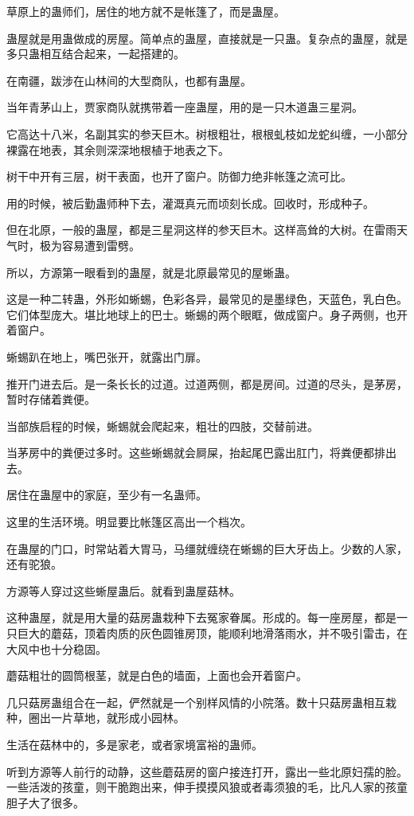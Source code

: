 \begin{this_body}
草原上的蛊师们，居住的地方就不是帐篷了，而是蛊屋。

蛊屋就是用蛊做成的房屋。简单点的蛊屋，直接就是一只蛊。复杂点的蛊屋，就是多只蛊相互结合起来，一起搭建的。

在南疆，跋涉在山林间的大型商队，也都有蛊屋。

当年青茅山上，贾家商队就携带着一座蛊屋，用的是一只木道蛊三星洞。

它高达十八米，名副其实的参天巨木。树根粗壮，根根虬枝如龙蛇纠缠，一小部分裸露在地表，其余则深深地根植于地表之下。

树干中开有三层，树干表面，也开了窗户。防御力绝非帐篷之流可比。

用的时候，被后勤蛊师种下去，灌溉真元而顷刻长成。回收时，形成种子。

但在北原，一般的蛊屋，都是三星洞这样的参天巨木。这样高耸的大树。在雷雨天气时，极为容易遭到雷劈。

所以，方源第一眼看到的蛊屋，就是北原最常见的屋蜥蛊。

这是一种二转蛊，外形如蜥蜴，色彩各异，最常见的是墨绿色，天蓝色，乳白色。它们体型庞大。堪比地球上的巴士。蜥蜴的两个眼眶，做成窗户。身子两侧，也开着窗户。

蜥蜴趴在地上，嘴巴张开，就露出门扉。

推开门进去后。是一条长长的过道。过道两侧，都是房间。过道的尽头，是茅房，暂时存储着粪便。

当部族启程的时候，蜥蜴就会爬起来，粗壮的四肢，交替前进。

当茅房中的粪便过多时。这些蜥蜴就会屙屎，抬起尾巴露出肛门，将粪便都排出去。

居住在蛊屋中的家庭，至少有一名蛊师。

这里的生活环境。明显要比帐篷区高出一个档次。

在蛊屋的门口，时常站着大胃马，马缰就缠绕在蜥蜴的巨大牙齿上。少数的人家，还有驼狼。

方源等人穿过这些蜥屋蛊后。就看到蛊屋菇林。

这种蛊屋，就是用大量的菇房蛊栽种下去冤家眷属。形成的。每一座房屋，都是一只巨大的蘑菇，顶着肉质的灰色圆锥房顶，能顺利地滑落雨水，并不吸引雷击，在大风中也十分稳固。

蘑菇粗壮的圆筒根茎，就是白色的墙面，上面也会开着窗户。

几只菇房蛊组合在一起，俨然就是一个别样风情的小院落。数十只菇房蛊相互栽种，圈出一片草地，就形成小园林。

生活在菇林中的，多是家老，或者家境富裕的蛊师。

听到方源等人前行的动静，这些蘑菇房的窗户接连打开，露出一些北原妇孺的脸。一些活泼的孩童，则干脆跑出来，伸手摸摸风狼或者毒须狼的毛，比凡人家的孩童胆子大了很多。


\end{this_body}
